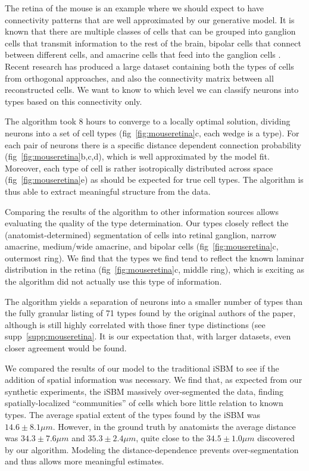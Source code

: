 \documentclass{article}
\begin{document}
The retina of the mouse \autocite{Masland2001} is an example where we
should expect to have connectivity patterns that are well approximated
by our generative model. It is known that there are multiple classes
of cells that can be grouped into ganglion cells that transmit
information to the rest of the brain, bipolar cells that connect
between different cells, and amacrine cells that feed into the
ganglion cells \autocite{cite some review}. Recent research
\autocite{Helmstaedter2013} has produced a large dataset containing
both the types of cells from orthogonal approaches, and also the
connectivity matrix between all reconstructed cells. We want to know
to which level we can classify neurons into types based on this
connectivity only.

The algorithm took 8 hours to converge to a locally optimal solution,
dividing neurons into a set of cell types (fig~\ref{fig:mouseretina}c, each
wedge is a type). For each pair of neurons there is a specific
distance dependent connection probability (fig~\ref{fig:mouseretina}b,c,d),
which is well approximated by the model fit. Moreover, each type of
cell is rather isotropically distributed across space
(fig~\ref{fig:mouseretina}e) as should be expected for true cell types. The
algorithm is thus able to extract meaningful structure from the data.

Comparing the results of the algorithm to other information sources
allows evaluating the quality of the type determination. Our types
closely reflect the (anatomist-determined) segmentation of cells into
retinal ganglion, narrow amacrine, medium/wide amacrine, and bipolar
cells (fig~\ref{fig:mouseretina}c, outermost ring). We find that the
types we find tend to reflect the known laminar distribution in the
retina (fig~\ref{fig:mouseretina}c, middle ring), which is exciting as
the algorithm did not actually use this type of information.


The algorithm yields a separation of neurons into a smaller number of
types than the fully granular listing of 71 types found by the
original authors of the paper, although is still highly correlated
with those finer type distinctions (see
supp~\ref{supp:mouseretina}. It is our expectation that, with larger
datasets, even closer agreement would be found.


We compared the results of our model to the traditional iSBM to see if
the addition of spatial information was necessary. We find that, as
expected from our synthetic experiments, the iSBM massively
over-segmented the data, finding spatially-localized “communities” of
cells which bore little relation to known types.  The average spatial
extent of the types found by the iSBM was $14.6\pm8.1 \mu m$. However,
in the ground truth by anatomists the average distance was $34.3\pm7.6
\mu m$ and $35.3\pm 2.4 \mu m$, quite close to the $34.5\pm 1.0 \mu m$
discovered by our algorithm. Modeling the distance-dependence prevents
over-segmentation and thus allows more meaningful estimates.
\end{document}
